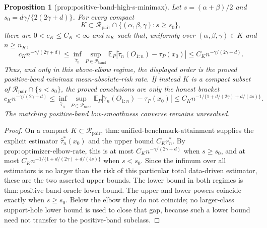 \documentclass{article}
\newtheorem{proposition}{Proposition}
\begin{document}
\begin{proposition}[prop:positive-band-high-s-minimax]\label{prop:positive-band-high-s-minimax}
Let \(s=(\alpha+\beta)/2\) and \(s_0=d\gamma/\{2(2\gamma+d)\}\).  For every compact
\[
 K\subset\mathcal R_{\mathrm{pair}}\cap\{(\alpha,\beta,\gamma):s\geq s_0\},
\]
there are \(0<c_K\leq C_K<\infty\) and \(n_K\) such that, uniformly over \((\alpha,\beta,\gamma)\in K\) and \(n\geq n_K\),
\[
 c_Kn^{-\gamma/(2\gamma+d)}
 \leq
 \inf_{\widetilde\tau_n}\sup_{P\in\mathcal P_{\mathrm{band}}}
 \mathbb E_P|\widetilde\tau_n(O_{1:n})-\tau_P(x_0)|
 \leq C_Kn^{-\gamma/(2\gamma+d)}.
\]
Thus, and only in this above-elbow regime, the displayed order is the proved positive-band minimax mean-absolute-risk rate.  If instead \(K\) is a compact subset of \(\mathcal R_{\mathrm{pair}}\cap\{s<s_0\}\), the proved conclusions are only the honest bracket
\[
 c_Kn^{-\gamma/(2\gamma+d)}
 \leq
 \inf_{\widetilde\tau_n}\sup_{P\in\mathcal P_{\mathrm{band}}}
 \mathbb E_P|\widetilde\tau_n(O_{1:n})-\tau_P(x_0)|
 \leq C_Kn^{-1/\{1+d/(2\gamma)+d/(4s)\}}.
\]
The matching positive-band low-smoothness converse remains unresolved.
\end{proposition}
\begin{proof}
On a compact \(K\subset\mathcal R_{\mathrm{pair}}\), \(\mathrm{thm:unified\mbox{-}benchmark\mbox{-}attainment}\) supplies the explicit estimator \(\widehat\tau_n^*(x_0)\) and the upper bound \(C_Kr_n^*\).  By \(\mathrm{prop:optimizer\mbox{-}elbow\mbox{-}rate}\), this is at most \(C_Kn^{-\gamma/(2\gamma+d)}\) when \(s\geq s_0\), and at most \(C_Kn^{-1/\{1+d/(2\gamma)+d/(4s)\}}\) when \(s<s_0\).  Since the infimum over all estimators is no larger than the risk of this particular total data-driven estimator, these are the two asserted upper bounds.  The lower bound in both regimes is \(\mathrm{thm:positive\mbox{-}band\mbox{-}oracle\mbox{-}lower\mbox{-}bound}\).  The upper and lower powers coincide exactly when \(s\geq s_0\).  Below the elbow they do not coincide; no larger-class support-hole lower bound is used to close that gap, because such a lower bound need not transfer to the positive-band subclass.
\end{proof}
\end{document}
